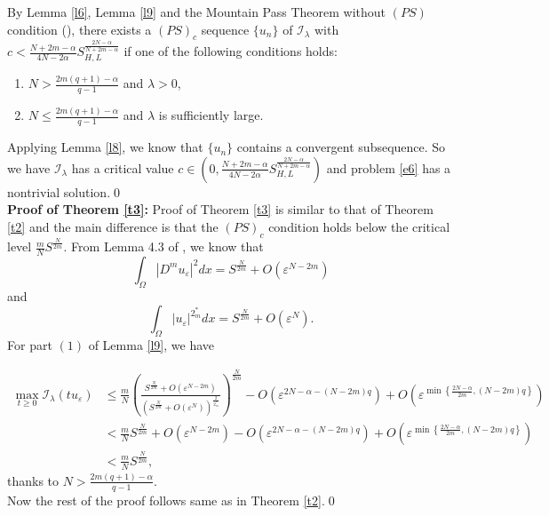 \documentclass[reqno]{amsart}
\newcommand{\la} {\lambda}
\newcommand{\eps}{\varepsilon}
\newcommand{\Om}{\Omega}
\newcommand{\al} {\alpha}
\newcommand{\noi} {  \noindent}
\newcommand{\mc} {\mathcal}
\numberwithin{theorem}{section} \numberwithin{equation}{section}
\begin{document}
\noi{\bf{Proof of Theorem \ref{t2}}}
By Lemma \ref{l6}, Lemma \ref{l9} and the Mountain Pass Theorem without $(PS)$ condition (\cite{4willem1996minimax}), there exists a $(PS)_c$ sequence $\{u_n\}$ of $\mc{I_\la}$ with $c<\frac{N+2m-\al}{4 N-2\al} S_{H, L}^{\frac{2N-\al}{N+2m-\al}}$ if one of the following conditions holds:
\begin{enumerate}   
\item $N>\frac{2m(q+1)-\al}{q-1}$ and $\la>0$,
\item $N \leq \frac{2m(q+1)-\al}{q-1}$ and $\la$ is sufficiently large. 
\end{enumerate} 
Applying Lemma \ref{l8}, we know that $\{u_n\}$ contains a convergent subsequence. So we have $\mc{I_\la}$ has a critical value $c \in\left(0, \frac{N+2m-\al}{4 N-2\al} S_{H, L}^{\frac{2N-\al}{N+2m-\al}}\right)$ and problem \eqref{e6} has a nontrivial solution.\qed\\
{\bf{ Proof of Theorem \ref{t3}:}}  Proof of Theorem \ref{t3} is similar to that of Theorem \ref{t2} and the main difference is that the $(PS)_c$ condition holds below the critical level $\frac{m}{N} S^{\frac{N}{2m}}$. From Lemma 4.3 of \cite{22shang2014multiple}, we know that
\[\int_{\Om}\left|D^m u_{\eps}\right|^2 d x=S^{\frac{N}{2m}}+O\left(\eps^{N-2m}\right)\]
and
\[\int_{\Om}\left|u_{\eps}\right|^{2^*_m} d x=S^{\frac{N}{2m}}+O\left(\eps^N\right).\]
For  part $(1)$ of Lemma \ref{l9}, we have

\begin{align*}
\max _{t \geq 0} \mc{I_\la}\left(t u_{\eps}\right) & \leq \frac{m}{N}\left(\frac{S^{\frac{N}{2m}}+O\left(\eps^{N-2m}\right)}{\left(S^{\frac{N}{2m}}+O\left(\eps^N\right)\right)^{\frac{2}{2_m^*}}}\right)^{\frac{N}{2m}}-O\left(\eps^{2N-\al-(N-2m) q}\right)+O\left(\eps^{\min \left\{\frac{2N-\al}{2m}, (N-2m) q\right\}}\right) \\
& <\frac{m}{N} S^{\frac{N}{2m}}+O\left(\eps^{N-2m}\right)-O\left(\eps^{2N-\al-(N-2m) q}\right)+O\left(\eps^{\min \left\{\frac{2N-\al}{2m}, (N-2m)q\right\}}\right) \\
& <\frac{m}{N} S^{\frac{N}{2m}},
\end{align*}
thanks to $N>\frac{2m(q+1)-\al}{q-1}$.\\  Now the rest of the proof follows same as in Theorem \ref{t2}.\qed\\
\end{document}
